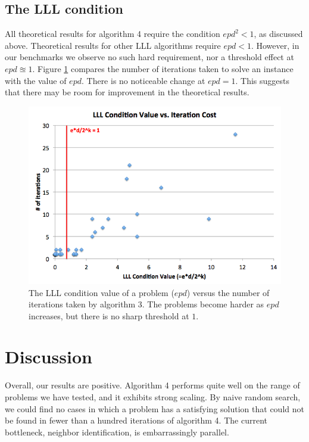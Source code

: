 \documentclass[twocolumn]{article}
\begin{document}
\subsection{The LLL condition}
All theoretical results for algorithm 4 require the condition $e p d^2 < 1$, as discussed above.  Theoretical results for other LLL algorithms require $e p d < 1$.  However, in our benchmarks we observe no such hard requirement, nor a threshold effect at $e p d \approxeq 1$.  Figure \ref{fig:lll-condition} compares the number of iterations taken to solve an instance with the value of $e p d$.  There is no noticeable change at $e p d = 1$.  This suggests that there may be room for improvement in the theoretical results.

\begin{figure}[ht]
  \includegraphics[scale=0.4]{figures/lll-condition.png}
  \caption{The LLL condition value of a problem ($e p d$) versus the number of iterations taken by algorithm 3.  The problems become harder as $e p d$ increases, but there is no sharp threshold at $1$.}
  \label{fig:lll-condition}
\end{figure}

\section{Discussion}
\label{sec:discussion}
Overall, our results are positive.  Algorithm 4 performs quite well on the range of problems we have tested, and it exhibits strong scaling.  By naive random search, we could find no cases in which a problem has a satisfying solution that could not be found in fewer than a hundred iterations of algorithm 4.  The current bottleneck, neighbor identification, is embarrassingly parallel.
\end{document}
